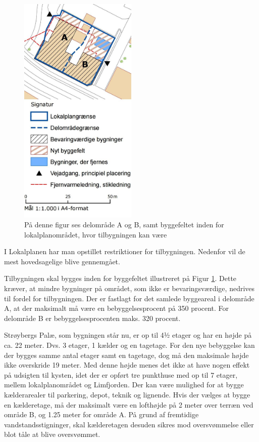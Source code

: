 \begin{figure}[H] 
\centering
\includegraphics[width=0.50\textwidth]{billeder/Lokalplan2}
\caption{På denne figur ses delområde A og B, samt byggefeltet inden for lokalplanområdet, hvor tilbygningen kan være}
\label{fig:Lokalplan2}
\end{figure}

I Lokalplanen har man opstillet restriktioner for tilbygningen. Nedenfor vil de mest hovedsagelige blive gennemgået.

Tilbygningen skal bygges inden for byggefeltet illustreret på Figur \ref{fig:Lokalplan2}. Dette kræver, at mindre bygninger på området, som ikke er bevaringsværdige, nedrives til fordel for tilbygningen. Der er fastlagt for det samlede byggeareal i delområde A, at der maksimalt må være en bebyggelsesprocent på 350 procent. For delområde B er bebyggelsesprocenten maks. 320 procent. 

Strøybergs Palæ, som bygningen står nu, er op til 4½ etager og har en højde på ca. 22 meter. Dvs. 3 etager, 1 kælder og en tagetage. For den nye bebyggelse kan der bygges samme antal etager samt en tagetage, dog må den maksimale højde ikke overskride 19 meter. Med denne højde menes det ikke at have nogen effekt på udsigten til kysten, idet der er opført tre punkthuse med op til 7 etager, mellem lokalplanområdet og Limfjorden. Der kan være mulighed for at bygge kælderarealer til parkering, depot, teknik og lignende. Hvis der vælges at bygge en kælderetage, må der maksimalt være en lofthøjde på 2 meter over terræn ved område B, og 1.25 meter for område A. På grund af fremtidige vandstandsstigninger, skal kælderetagen desuden sikres mod oversvømmelse eller blot tåle at blive oversvømmet. 

